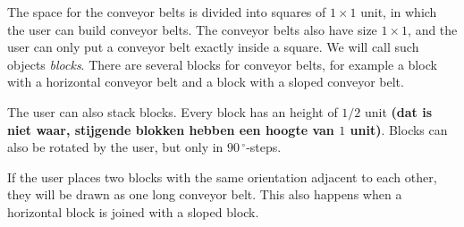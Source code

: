 The space for the conveyor belts is divided into squares of $1 \times 1$ unit, in which the user can build conveyor belts. The conveyor belts also have size $1 \times 1$, and the user can only put a conveyor belt exactly inside a square. We will call such objects \textit{blocks}. There are several blocks for conveyor belts, for example a block with a horizontal conveyor belt and a block with a sloped conveyor belt.

The user can also stack blocks. Every block has an height of $1/2$ unit \textbf{(dat is niet waar, stijgende blokken hebben een hoogte van $1$ unit)}. Blocks can also be rotated by the user, but only in $90\,^\circ$-steps.

If the user places two blocks with the same orientation adjacent to each other, they will be drawn as one long conveyor belt. This also happens when a horizontal block is joined with a sloped block.